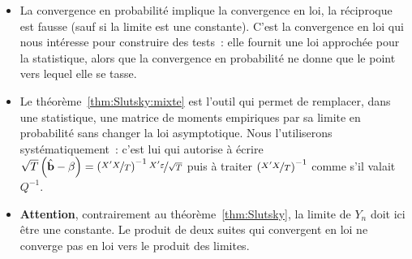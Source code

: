 \documentclass[10pt,a4paper]{article}
\theoremstyle{definition}
\renewcommand{\newline}{\unskip\par\vspace{1.5pt}}
\begin{document}
\begin{notes}

  \begin{itemize}

  \item La convergence en probabilité implique la convergence en loi, la
    réciproque est fausse (sauf si la limite est une constante). C'est la
    convergence en loi qui nous intéresse pour construire des tests~: elle
    fournit une loi approchée pour la statistique, alors que la convergence en
    probabilité ne donne que le point vers lequel elle se tasse.\newline

  \item Le théorème~\ref{thm:Slutsky:mixte} est l'outil qui permet de remplacer,
    dans une statistique, une matrice de moments empiriques par sa limite en
    probabilité sans changer la loi asymptotique. Nous l'utiliserons
    systématiquement~: c'est lui qui autorise à écrire
    $\sqrt{T}\left(\hat{\mathbf b}-\beta\right) = \left(\nicefrac{X'X}{T}\right)^{-1}\nicefrac{X'\varepsilon}{\sqrt T}$
    puis à traiter $\left(\nicefrac{X'X}{T}\right)^{-1}$ comme s'il valait
    $Q^{-1}$.\newline

  \item \textbf{Attention}, contrairement au théorème~\ref{thm:Slutsky}, la
    limite de $Y_n$ doit ici être une constante. Le produit de deux suites qui
    convergent en loi ne converge pas en loi vers le produit des limites.

  \end{itemize}

\end{notes}
\end{document}
